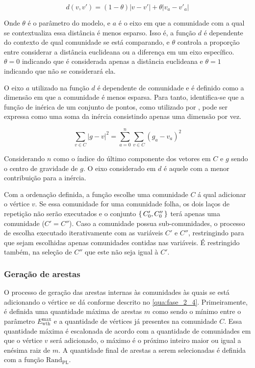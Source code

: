 \documentclass[notes.tex]{subfiles}
\begin{document}
\begin{equation}
d(v, v') = (1-\theta)|v-v'| + \theta|v_a - v'_a|
\end{equation}

Onde $\theta$ é o parâmetro do modelo, e  $a$ é o eixo em que a comunidade com a qual se contextualiza essa distância é menos esparso. 
Isso é, a função $d$ é dependente do contexto de qual comunidade se está comparando, e $\theta$ controla a proporção entre considerar a distância euclideana ou a diferença em um eixo específico.
$\theta = 0$ indicando que é considerada apenas a distância euclideana e $\theta = 1$ indicando que não se considerará ela.

O eixo $a$ utilizado na função $d$ é dependente de comunidade e é definido como a dimensão em que a comunidade é menos esparsa.
Para tanto, identifica-se que a função de inérica de um conjunto de pontos, como utilizado por , pode ser expressa como uma soma da inércia consistindo apenas uma dimensão por vez.

\begin{equation}
\sum_{v \in C} |g-v|^2 = \sum_{a=0}^{n}\sum_{v \in C}(g_a - v_a)^2
\end{equation}

Considerando $n$ como o índice do último componente dos vetores em $C$ e $g$ sendo o centro de gravidade de $g$.
O eixo considerado em $d$ é aquele com a menor contribuição para a inércia.

Com a ordenação definida, a função escolhe uma comunidade $C$ á qual adicionar o vértice $v$.
Se essa comunidade for uma comunidade folha, os dois laços de repetição não serão executados e o conjunto $\set{C'_0, C''_0}$ terá apenas uma comunidade ($C' = C''$).
Caso a comunidade possua sub-comunidades, o processo de escolha executado iterativamente com as variáveis $C'$ e  $C''$, restringindo para que sejam escolhidas apenas comunidades contidas nas variáveis.
É restringido também, na seleção de $C''$ que este não seja igual à  $C'$.

\subsubsection{Geração de arestas}

O processo de geração das arestas internas às comunidades às quais se está adicionando o vértice se dá conforme descrito no \autoref{qua:fase_2_4}.
Primeiramente, é definida uma quantidade máxima de arestas $m$ como sendo o mínimo entre o parâmetro $E_\text{wth}^\text{max}$ e a quantidade de vértices já presentes na comunidade $C$.
Essa quantidade máxima é escalonada de acordo com a quantidade de comunidades em que o vértice $v$ será adicionado, o máximo é o próximo inteiro maior ou igual a enésima raiz de $m$.
A quantidade final de arestas a serem selecionadas é definida com a função $\text{Rand}_\text{PL}$.
\end{document}
